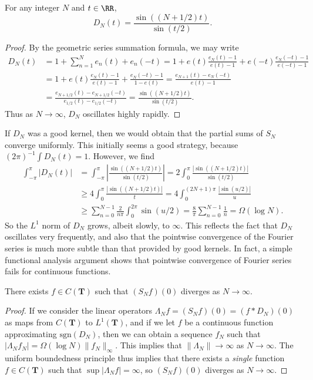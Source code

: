 \begin{theorem}
	For any integer $N$ and $t \in \RR$,
	\[ D_N(t) = \frac{\sin((N+1/2)t)}{\sin(t/2)}. \]
\end{theorem}
\begin{proof}
	By the geometric series summation formula, we may write
    \begin{align*}
        D_N(t) &= 1 + \sum_{n = 1}^N e_n(t) + e_n(-t) = 1 + e(t) \frac{e_N(t) - 1}{e(t) - 1} + e(-t) \frac{e_N(-t) - 1}{e(-t) - 1}\\
        &= 1 + e(t) \frac{e_N(t) - 1}{e(t) - 1} + \frac{e_N(-t) - 1}{1 - e(t)} = \frac{e_{N+1}(t) - e_N(-t)}{e(t) - 1}\\
        &= \frac{e_{N+1/2}(t) - e_{N+1/2}(-t)}{e_{1/2}(t) - e_{1/2}(-t)} = \frac{\sin((N + 1/2)t)}{\sin(t/2)}.
    \end{align*}
    Thus as $N \to \infty$, $D_N$ oscillates highly rapidly.
\end{proof}


If $D_N$ was a good kernel, then we would obtain that the partial sums of $S_N$ converge uniformly. This initially seems a good strategy, because $(2\pi)^{-1} \int D_N(t) = 1$. However, we find
%
\begin{align*}
    \int_{-\pi}^\pi |D_N(t)| &= \int_{-\pi}^\pi \left| \frac{\sin((N + 1/2)t)}{\sin(t/2)} \right| = 2 \int_0^\pi \frac{|\sin((N+1/2) t)|}{\sin(t/2)}\\
    &\geq 4 \int_0^\pi \frac{|\sin((N+1/2) t)|}{t} = 4 \int_0^{(2N+1)\pi} \frac{|\sin(u/2)|}{u}\\
    &\geq \sum_{n = 0}^{N-1} \frac{2}{n \pi} \int_0^{2 \pi} \sin(u/2) = \frac{8}{\pi} \sum_{n = 0}^{N-1} \frac{1}{n} = \Omega(\log N).
\end{align*}
%
So the $L^1$ norm of $D_N$ grows, albeit slowly, to $\infty$. This reflects the fact that $D_N$ oscillates very frequently, and also that the pointwise convergence of the Fourier series is much more subtle than that provided by good kernels. In fact, a simple functional analysis argument shows that pointwise convergence of Fourier series fails for continuous functions.

\begin{theorem}
	There exists $f \in C(\mathbf{T})$ such that $(S_N f)(0)$ diverges as $N \to \infty$.
\end{theorem}
\begin{proof}
	If we consider the linear operators $\Lambda_N f = (S_N f)(0) = (f * D_N)(0)$ as maps from $C(\mathbf{T})$ to $L^1(\mathbf{T})$, and if we let $f$ be a continuous function approximating $\text{sgn}(D_N)$, then we can obtain a sequence $f_N$ such that $|\Lambda_N f_N| = \Omega(\log N) \| f_N \|_\infty$. This implies that $\| \Lambda_N \| \to \infty$ as $N \to \infty$. The uniform boundedness principle thus implies that there exists a {\it single} function $f \in C(\mathbf{T})$ such that $\sup |\Lambda_N f| = \infty$, so $(S_N f)(0)$ diverges as $N \to \infty$.
\end{proof}

